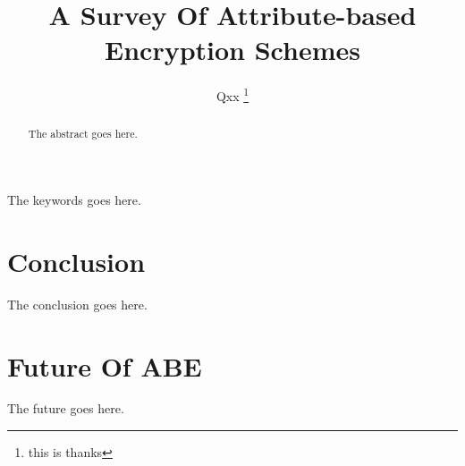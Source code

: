 \documentclass[journal]{IEEEtran}
\begin{document}
\title{A Survey Of Attribute-based Encryption Schemes}


\author{Qxx%
\thanks{this is thanks}
}%






\maketitle


\begin{abstract}
The abstract goes here.
\end{abstract}

\begin{IEEEkeywords}
The keywords goes here\cite{Donald:ISCA'06}.
\end{IEEEkeywords}

\IEEEpeerreviewmaketitle

















\section{Conclusion}\label{sec:conclusion}
The conclusion goes here.




\section{Future Of ABE}\label{sec:future of ABE}
The future goes here.


%
%
%
\end{document}
